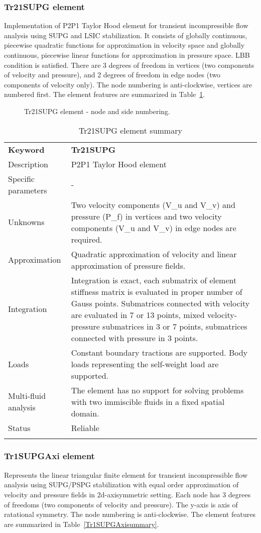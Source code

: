 \documentclass[a4paper]{article}
\newcommand{\templabel}{}%
\newcommand{\tempcaption}{}%
\newcounter{nelpar}
\newenvironment{elementsummary}[5]{%
  \gdef\tempcaption{#4}%
  \gdef\templabel{#5}%
  \setcounter{nelpar}{0}%
  \begin{center} %
    \begin{table}[!htb] %
      \begin{tabular}{|l|p{9cm}|}\hline %
        {\bf Keyword} & \bf{#1}\\ %
        {Description} & {#2}\\ %
        {Specific parameters} & {#3}\\ \hline %
}{
  \\ \hline %
      \end{tabular}%
      \caption{\tempcaption}%
      \label{\templabel}%
    \end{table}%
  \end{center}%
}
\newcommand{\elementDescription}[2]{{#1} & {#2}\\ }
\begin{document}
\subsubsection{Tr21SUPG element}
\label{Tr21SUPG}
Implementation of P2P1 Taylor Hood element for transient incompressible flow analysis 
using SUPG and LSIC stabilization. It consists of globally continuous, piecewise quadratic functions for 
approximation in velocity space and globally continuous, piecewise linear functions for
approximation in pressure space. LBB condition is satisfied. There are 3 degrees
of freedom in vertices (two components of velocity and pressure), and 2 degrees of freedom
in edge nodes (two components of velocity only).
The node numbering is anti-clockwise, vertices are numbered first. The element features are summarized in Table~\ref{Tr21SUPGsummary}.

\begin{figure}[htb]
 \centering
 \begin{makeimage}
  
 \end{makeimage}
 \caption{Tr21SUPG element - node and side numbering.}
 \label{Tr21SUPGfig}
\end{figure}

\begin{elementsummary}{Tr21SUPG}{P2P1 Taylor Hood element}{-}{Tr21SUPG element summary}{Tr21SUPGsummary}
\elementDescription{Unknowns}{Two velocity components (V\_u and V\_v) and pressure (P\_f) in vertices and two velocity components (V\_u and V\_v) in edge nodes are required.}
\elementDescription{Approximation}{Quadratic approximation of velocity and linear approximation of pressure fields.}
\elementDescription{Integration}{Integration is exact, each submatrix of element stiffness matrix is evaluated in proper number of
Gauss points. Submatrices connected with velocity are evaluated in 7 or 13 points, mixed velocity-pressure
submatrices in 3 or 7 points, submatrices connected with pressure in 3 points.}
\elementDescription{Loads}{Constant boundary tractions are supported. Body loads
representing the self-weight load are supported.}
\elementDescription{Multi-fluid analysis}{The element has no support for solving
problems with two immiscible fluids in a fixed spatial domain.}
\elementDescription{Status}{Reliable}
\end{elementsummary}


\subsubsection{Tr1SUPGAxi element}
\label{Tr1SUPGAxi}
Represents the linear triangular finite element for transient
incompressible flow analysis using SUPG/PSPG stabilization with equal order
approximation of velocity and pressure fields in 2d-axisymmetric setting. Each node has 3 degrees
of freedoms (two components of velocity and pressure). The y-axis is
axis of ratational symmetry. The node numbering is anti-clockwise. The element features are summarized in Table~\ref{Tr1SUPGAxisummary}.
\end{document}
